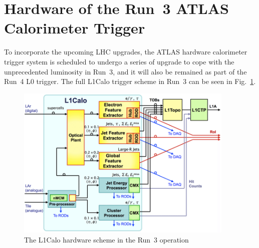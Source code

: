 \section{Hardware of the Run~3 ATLAS Calorimeter Trigger}
To incorporate the upcoming LHC upgrades, the ATLAS hardware calorimeter trigger system is scheduled to undergo a series of upgrade to cope with the unprecedented luminosity in Run~3, and it will also be remained as part of the Run~4 L0 trigger. The full L1Calo trigger scheme in Run~3 can be seen in Fig.~\ref{Fig:l1calo_scheme}.
\begin{figure}[!h]                
	\includegraphics[width=0.93\textwidth]{Chapter6/L1Calo.png}
	\begin{center}
		\caption{The L1Calo hardware scheme in the Run~3 operation\cite{Schwienhorst:2016efd}}
		\label{Fig:l1calo_scheme}            
	\end{center}
\end{figure}
\noindent
